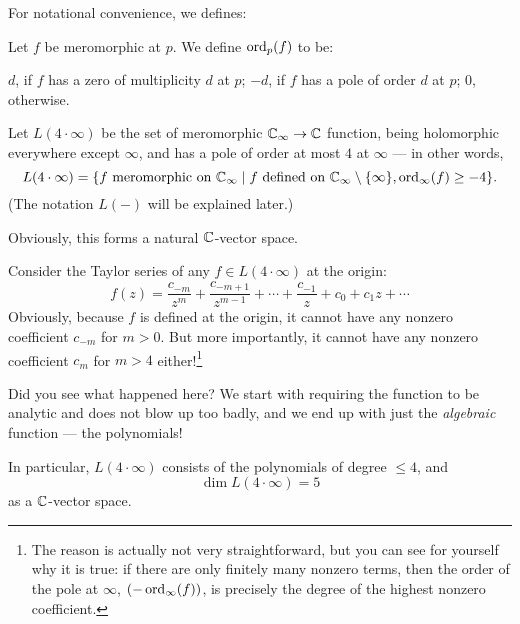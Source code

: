 For notational convenience, we defines:
\begin{definition}
	Let $f$ be meromorphic at $p$. We define $\operatorname{ord}_p(f)$ to be:
	\begin{itemize}
		\ii $d$, if $f$ has a zero of multiplicity $d$ at $p$;
		\ii $-d$, if $f$ has a pole of order $d$ at $p$;
		\ii $0$, otherwise.
	\end{itemize}
\end{definition}

\begin{example}
	Let $L(4 \cdot \infty)$ be the set of meromorphic $\mathbb C_\infty \to \mathbb C$ function, being
	holomorphic everywhere except $\infty$, and has a pole of order at most $4$ at $\infty$ ---
	in other words,
	\[
		L(4 \cdot \infty) = \{ \text{$f$ meromorphic on $\mathbb C_\infty$} \mid \text{$f$ defined on
		$\mathbb C_\infty \setminus \{ \infty \}$}, \operatorname{ord}_\infty(f) \geq -4 \}.
	\]
	(The notation $L(-)$ will be explained later.)

	Obviously, this forms a natural $\mathbb C$-vector space.

	Consider the Taylor series of any $f \in L(4 \cdot \infty)$ at the origin:
	\[
		f(z) = \frac{c_{-m}}{z^m} + \frac{c_{-m+1}}{z^{m-1}} + \cdots + \frac{c_{-1}}{z} + c_0 +
		c_1 z + \cdots
	\]
	Obviously, because $f$ is defined at the origin, it cannot have any nonzero coefficient $c_{-m}$
	for $m > 0$.
	But more importantly, it cannot have any nonzero coefficient $c_m$ for $m > 4$
	either!\footnote{The reason is actually not very straightforward, but you can see for yourself
		why it is true: if there are only finitely many nonzero terms, then the order of the pole at
		$\infty$, $(-\operatorname{ord}_\infty(f))$, is precisely the degree of the highest nonzero coefficient.}

	Did you see what happened here? We start with requiring the function to be analytic and does not
	blow up too badly, and we end up with just the \emph{algebraic} function --- the polynomials!

	In particular, $L(4 \cdot \infty)$ consists of the polynomials of degree $\leq 4$, and
	\[
		\dim L(4 \cdot \infty) = 5
	\]
	as a $\mathbb C$-vector space.
\end{example}

